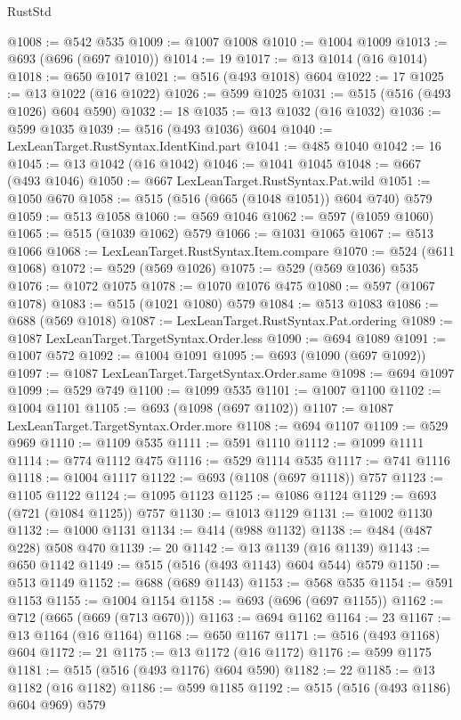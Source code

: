 \begin{lexlean}{RustStd}
\begin{coremodule}
{\begin{coremodule}
{{{{{{{{{{{{{@1008 := @542 @535
@1009 := @1007 @1008
@1010 := @1004 @1009
@1013 := @693 (@696 (@697 @1010))
@1014 := 19
@1017 := @13 @1014 (@16 @1014)
@1018 := @650 @1017
@1021 := @516 (@493 @1018) @604
@1022 := 17
@1025 := @13 @1022 (@16 @1022)
@1026 := @599 @1025
@1031 := @515 (@516 (@493 @1026) @604 @590)
@1032 := 18
@1035 := @13 @1032 (@16 @1032)
@1036 := @599 @1035
@1039 := @516 (@493 @1036) @604
@1040 := LexLeanTarget.RustSyntax.IdentKind.part
@1041 := @485 @1040
@1042 := 16
@1045 := @13 @1042 (@16 @1042)
@1046 := @1041 @1045
@1048 := @667 (@493 @1046)
@1050 := @667 LexLeanTarget.RustSyntax.Pat.wild
@1051 := @1050 @670
@1058 := @515 (@516 (@665 (@1048 @1051)) @604 @740) @579
@1059 := @513 @1058
@1060 := @569 @1046
@1062 := @597 (@1059 @1060)
@1065 := @515 (@1039 @1062) @579
@1066 := @1031 @1065
@1067 := @513 @1066
@1068 := LexLeanTarget.RustSyntax.Item.compare
@1070 := @524 (@611 @1068)
@1072 := @529 (@569 @1026)
@1075 := @529 (@569 @1036) @535
@1076 := @1072 @1075
@1078 := @1070 @1076 @475
@1080 := @597 (@1067 @1078)
@1083 := @515 (@1021 @1080) @579
@1084 := @513 @1083
@1086 := @688 (@569 @1018)
@1087 := LexLeanTarget.RustSyntax.Pat.ordering
@1089 := @1087 LexLeanTarget.TargetSyntax.Order.less
@1090 := @694 @1089
@1091 := @1007 @572
@1092 := @1004 @1091
@1095 := @693 (@1090 (@697 @1092))
@1097 := @1087 LexLeanTarget.TargetSyntax.Order.same
@1098 := @694 @1097
@1099 := @529 @749
@1100 := @1099 @535
@1101 := @1007 @1100
@1102 := @1004 @1101
@1105 := @693 (@1098 (@697 @1102))
@1107 := @1087 LexLeanTarget.TargetSyntax.Order.more
@1108 := @694 @1107
@1109 := @529 @969
@1110 := @1109 @535
@1111 := @591 @1110
@1112 := @1099 @1111
@1114 := @774 @1112 @475
@1116 := @529 @1114 @535
@1117 := @741 @1116
@1118 := @1004 @1117
@1122 := @693 (@1108 (@697 @1118)) @757
@1123 := @1105 @1122
@1124 := @1095 @1123
@1125 := @1086 @1124
@1129 := @693 (@721 (@1084 @1125)) @757
@1130 := @1013 @1129
@1131 := @1002 @1130
@1132 := @1000 @1131
@1134 := @414 (@988 @1132)
@1138 := @484 (@487 @228) @508 @470
@1139 := 20
@1142 := @13 @1139 (@16 @1139)
@1143 := @650 @1142
@1149 := @515 (@516 (@493 @1143) @604 @544) @579
@1150 := @513 @1149
@1152 := @688 (@689 @1143)
@1153 := @568 @535
@1154 := @591 @1153
@1155 := @1004 @1154
@1158 := @693 (@696 (@697 @1155))
@1162 := @712 (@665 (@669 (@713 @670)))
@1163 := @694 @1162
@1164 := 23
@1167 := @13 @1164 (@16 @1164)
@1168 := @650 @1167
@1171 := @516 (@493 @1168) @604
@1172 := 21
@1175 := @13 @1172 (@16 @1172)
@1176 := @599 @1175
@1181 := @515 (@516 (@493 @1176) @604 @590)
@1182 := 22
@1185 := @13 @1182 (@16 @1182)
@1186 := @599 @1185
@1192 := @515 (@516 (@493 @1186) @604 @969) @579
}}}}}}}}}}}}}
\end{coremodule}}
\end{coremodule}
\end{lexlean}
